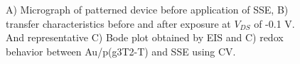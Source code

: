 \begin{figure}[ht]
    \centering
	\hspace{3em}    
    \qquad
    \caption[Performance of solid-OECT with drop-casted SSE]{A) Micrograph of patterned device before application of SSE, B) transfer characteristics before and after exposure at $V_{DS}$ of -0.1 V. And representative C) Bode plot obtained by EIS and C) redox behavior between Au/p(g3T2-T) and SSE using CV.}
    \label{fig:dropcast}
\end{figure}

